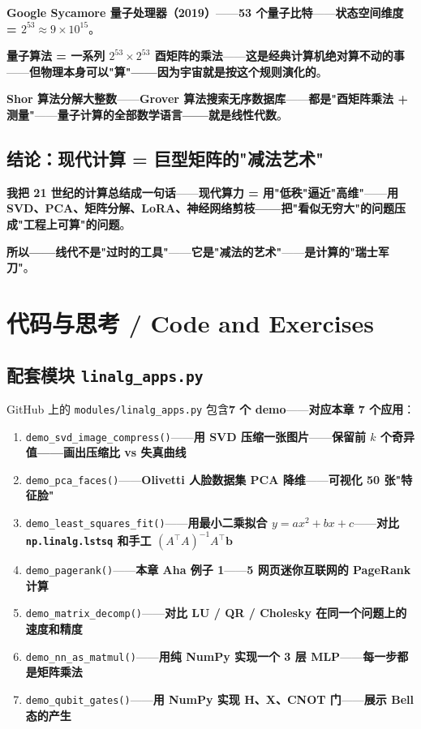 \textbf{Google Sycamore 量子处理器（2019）}——\textbf{53 个量子比特}——\textbf{状态空间维度 = $2^{53} \approx 9 \times 10^{15}$}。

\textbf{量子算法 = 一系列 $2^{53} \times 2^{53}$ 酉矩阵的乘法}——\textbf{这是经典计算机绝对算不动的事}——\textbf{但物理本身可以"算"——因为宇宙就是按这个规则演化的}。

\textbf{Shor 算法分解大整数}——\textbf{Grover 算法搜索无序数据库}——\textbf{都是"酉矩阵乘法 + 测量"}——\textbf{量子计算的全部数学语言——就是线性代数}。

\subsection{结论：现代计算 = 巨型矩阵的"减法艺术"}

\textbf{我把 21 世纪的计算总结成一句话}——\textbf{现代算力 = 用"低秩"逼近"高维"}——\textbf{用 SVD、PCA、矩阵分解、LoRA、神经网络剪枝——把"看似无穷大"的问题压成"工程上可算"的问题}。

\textbf{所以——线代不是"过时的工具"}——\textbf{它是"减法的艺术"}——\textbf{是计算的"瑞士军刀"}。

\section{代码与思考 / Code and Exercises}

\subsection{配套模块 \texttt{linalg\_apps.py}}

GitHub 上的 \texttt{modules/linalg\_apps.py} 包含\textbf{7 个 demo}——\textbf{对应本章 7 个应用}：

\begin{enumerate}
\item \texttt{demo\_svd\_image\_compress()}——\textbf{用 SVD 压缩一张图片}——\textbf{保留前 $k$ 个奇异值——画出压缩比 vs 失真曲线}
\item \texttt{demo\_pca\_faces()}——\textbf{Olivetti 人脸数据集 PCA 降维}——\textbf{可视化 50 张"特征脸"}
\item \texttt{demo\_least\_squares\_fit()}——\textbf{用最小二乘拟合 $y = ax^2 + bx + c$}——\textbf{对比 \texttt{np.linalg.lstsq} 和手工 $(A^{\!\top} A)^{-1} A^{\!\top} \bm{b}$}
\item \texttt{demo\_pagerank()}——\textbf{本章 Aha 例子 1}——\textbf{5 网页迷你互联网的 PageRank 计算}
\item \texttt{demo\_matrix\_decomp()}——\textbf{对比 LU / QR / Cholesky 在同一个问题上的速度和精度}
\item \texttt{demo\_nn\_as\_matmul()}——\textbf{用纯 NumPy 实现一个 3 层 MLP}——\textbf{每一步都是矩阵乘法}
\item \texttt{demo\_qubit\_gates()}——\textbf{用 NumPy 实现 H、X、CNOT 门}——\textbf{展示 Bell 态的产生}
\end{enumerate}

